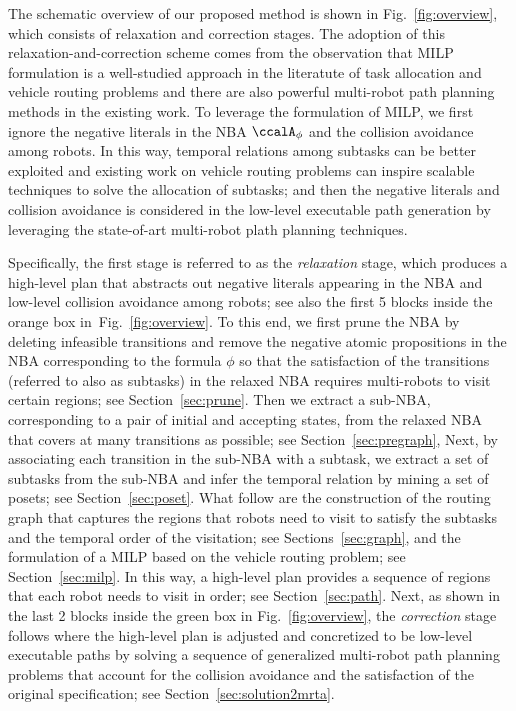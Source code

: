 \documentclass[Afour,sageh,times]{sagej}
\newcommand{\autop}{\ccalA_{\phi}}
\begin{document}
     {The schematic overview of our proposed  method is shown in Fig.~\ref{fig:overview}, which consists of relaxation and correction stages.  The adoption of this relaxation-and-correction scheme comes from the observation that MILP formulation is a well-studied approach in the literatute of task allocation and  vehicle routing problems and there are also powerful  multi-robot path planning methods in the existing work. To leverage the formulation of MILP, we first ignore the negative literals in the NBA $\autop$ and the collision avoidance among robots. In this way, temporal relations among subtasks can be better exploited  and existing work on vehicle routing problems can inspire scalable techniques to solve the allocation of subtasks; and then the negative literals and collision avoidance is considered in the low-level executable path generation by leveraging the state-of-art multi-robot plath planning techniques.

       Specifically, the first stage is referred to as the {\it relaxation} stage, which produces a high-level plan that abstracts out negative literals appearing in the NBA and low-level collision avoidance among robots; see also the first 5 blocks inside the orange box in~Fig.~\ref{fig:overview}. To this end, we first prune the NBA by deleting infeasible transitions and remove  the negative atomic propositions in the NBA corresponding to the formula $\phi$ so that the satisfaction of the transitions (referred to also as subtasks) in the relaxed NBA requires multi-robots to visit certain regions; see Section~\ref{sec:prune}. Then we extract a sub-NBA, corresponding to a pair of initial and accepting states, from the relaxed NBA that covers at many transitions as possible; see Section~\ref{sec:pregraph}, Next, by associating each transition in the sub-NBA with a subtask, we extract a set of subtasks from the sub-NBA and infer the temporal relation by mining a set of posets; see Section~\ref{sec:poset}. What follow are the construction of the routing graph that captures the regions that robots need to visit to satisfy the subtasks and the temporal order of the visitation; see Sections~\ref{sec:graph}, and the formulation of a MILP based on the vehicle routing problem; see Section~\ref{sec:milp}. In this way, a high-level plan  provides a sequence of regions that each robot needs to visit in order; see Section~\ref{sec:path}. Next, as shown in the last 2 blocks inside the green box in Fig.~\ref{fig:overview}, the {\it correction} stage follows  where the high-level plan is adjusted and concretized to be low-level executable paths by solving a sequence of generalized multi-robot path planning problems that account for the collision avoidance and the satisfaction of the  original specification; see Section~\ref{sec:solution2mrta}.

}
\end{document}
